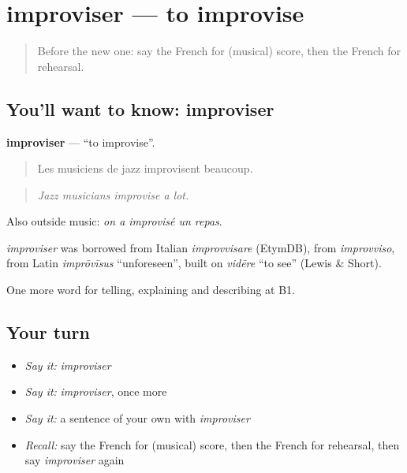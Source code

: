 \section[improviser]{improviser — to improvise}

\label{lesson:FR-C513-improviser}



\begin{quote}
Before the new one: say the French for (musical) score, then the French for rehearsal.
\end{quote}

\subsection*{You'll want to know: improviser}
\textbf{improviser} — \textquotedblleft{}to improvise\textquotedblright{}.

\begin{quote}
Les musiciens de jazz improvisent beaucoup.
\end{quote}

\begin{quote}
\emph{Jazz musicians improvise a lot.}
\end{quote}

Also outside music: \emph{on a improvisé un repas}.

\begin{cousinweb}
\emph{improviser} was borrowed from Italian \emph{improvvisare} (EtymDB), from \emph{improvviso}, from Latin \emph{imprōvīsus} \textquotedblleft{}unforeseen\textquotedblright{}, built on \emph{vidēre} \textquotedblleft{}to see\textquotedblright{} (Lewis \& Short).
\end{cousinweb}

\begin{grammarlens}[title={What you've built}]
One more word for telling, explaining and describing at B1.
\end{grammarlens}

\subsection*{Your turn}
\begin{itemize}
\raggedright
  \item \emph{Say it:} \emph{improviser}
  \item \emph{Say it:} \emph{improviser}, once more
  \item \emph{Say it:} a sentence of your own with \emph{improviser}
  \item \emph{Recall:} say the French for (musical) score, then the French for rehearsal, then say \emph{improviser} again
\end{itemize}

